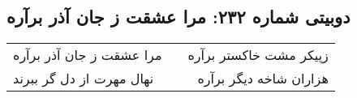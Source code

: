 \begin{center}
\section*{دوبیتی شماره ۲۳۲: مرا عشقت ز جان آذر برآره}
\label{sec:232}
\begin{longtable}{l p{0.5cm} r}
مرا عشقت ز جان آذر برآره
&&
زپیکر مشت خاکستر برآره
\\
نهال مهرت از دل گر ببرند
&&
هزاران شاخه دیگر برآره
\\
\end{longtable}
\end{center}
